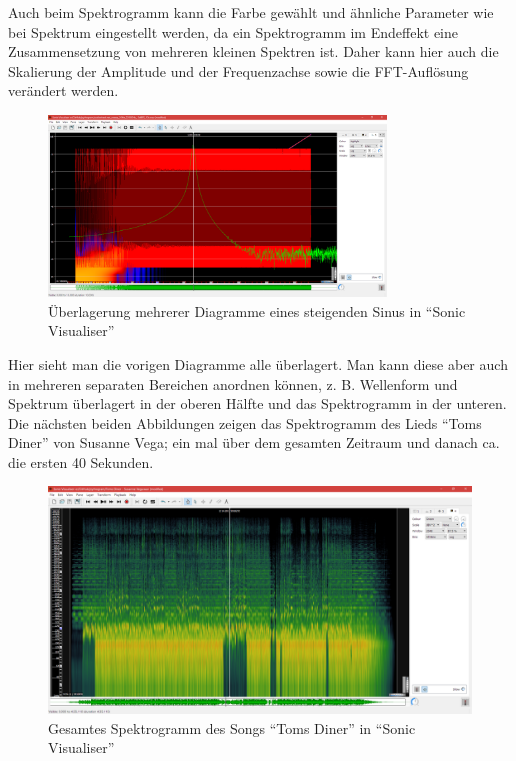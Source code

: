 \documentclass[a4paper]{article}
\begin{document}
\noindent
Auch beim Spektrogramm kann die Farbe gewählt und ähnliche Parameter wie bei Spektrum eingestellt werden, da ein Spektrogramm im Endeffekt eine Zusammensetzung von mehreren kleinen Spektren ist. Daher kann hier auch die Skalierung der Amplitude und der Frequenzachse sowie die FFT-Auflösung verändert werden.
\vspace{2em}
\begin{figure}[H]
    \centering
    \begin{minipage}{1.0\textwidth}
        \centering
        \includegraphics[width=0.8\textwidth]{Sonic_Sine_Sweep_overlay.png}
        \caption{Überlagerung mehrerer Diagramme eines steigenden Sinus in "`Sonic Visualiser"'}
    \end{minipage}
\end{figure}
\noindent
Hier sieht man die vorigen Diagramme alle überlagert. Man kann diese aber auch in mehreren separaten Bereichen anordnen können, z. B. Wellenform und Spektrum überlagert in der oberen Hälfte und das Spektrogramm in der unteren.
\vspace{2em}\\
Die nächsten beiden Abbildungen zeigen das Spektrogramm des Lieds "`Toms Diner"' von Susanne Vega; ein mal über dem gesamten Zeitraum und danach ca. die ersten 40 Sekunden.
\begin{figure}[H]
    \centering
    \begin{minipage}{1.0\textwidth}
        \centering
        \includegraphics[width=1.0\textwidth]{Sonic_Toms_Diner_Spectrogram_all.png}
        \caption{Gesamtes Spektrogramm des Songs "`Toms Diner"' in "`Sonic Visualiser"'}
    \end{minipage}
\end{figure}
\end{document}
